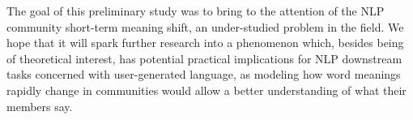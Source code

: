 
The goal of this preliminary study was to bring to the attention of the NLP community short-term meaning shift, 
an under-studied problem in the field. We hope that it will spark further research into a phenomenon which, besides being of theoretical interest, has potential practical implications for NLP downstream tasks concerned with user-generated language,
as modeling how word meanings rapidly change in communities would allow a better understanding of what their members say.



%


